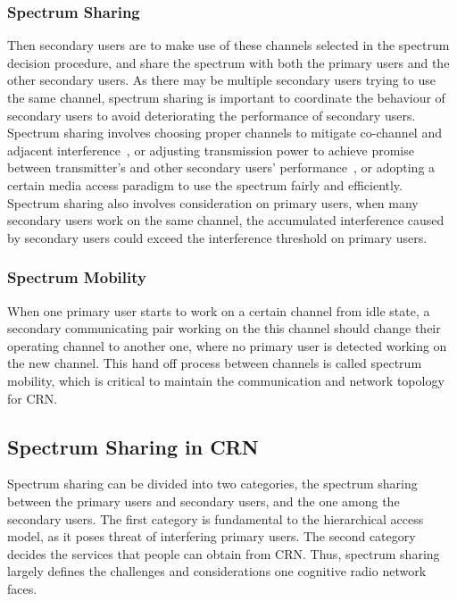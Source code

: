 \subsubsection*{Spectrum Sharing}
Then secondary users are to make use of these channels selected in the spectrum decision procedure, and share the spectrum with both the primary users and the other secondary users.
As there may be multiple secondary users trying to use the same channel, spectrum sharing is important to coordinate the behaviour of secondary users to avoid deteriorating the performance of secondary users.
Spectrum sharing involves choosing proper channels to mitigate co-channel and adjacent interference~\cite{ca_crn_survey_2013}, or adjusting transmission power to achieve promise between transmitter's and other secondary users' performance~\cite{pa_crn_survey_2012}, or adopting a certain media access paradigm to use the spectrum fairly and efficiently.
Spectrum sharing also involves consideration on primary users, \ie when many secondary users work on the same channel, the accumulated interference caused by secondary users could exceed the interference threshold on primary users.


\subsubsection*{Spectrum Mobility}
When one primary user starts to work on a certain channel from idle state, a secondary communicating pair working on the this channel should change their operating channel to another one, where no primary user is detected working on the new channel.
This hand off process between channels is called spectrum mobility, which is critical to maintain the communication and network topology for CRN.  





\subsection{Spectrum Sharing in CRN}
Spectrum sharing can be divided into two categories, the spectrum sharing between the primary users and secondary users, and the one among the secondary users.
The first category is fundamental to the hierarchical access model, as it poses threat of interfering primary users.
The second category decides the services that people can obtain from CRN.
Thus, spectrum sharing largely defines the challenges and considerations one cognitive radio network faces.


